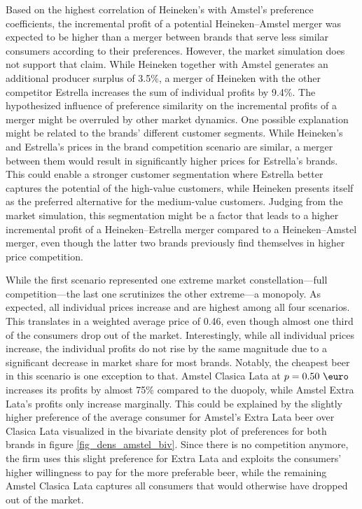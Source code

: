 \documentclass[12pt,a4paper]{article}
\begin{document}
Based on the highest correlation of Heineken's with Amstel's preference coefficients, the incremental profit of a potential Heineken--Amstel merger was expected to be higher than a merger between brands that serve less similar consumers according to their preferences.
However, the market simulation does not support that claim.
While Heineken together with Amstel generates an additional producer surplus of 3.5\%, a merger of Heineken with the other competitor Estrella increases the sum of individual profits by 9.4\%.
The hypothesized influence of preference similarity on the incremental profits of a merger might be overruled by other market dynamics.
One possible explanation might be related to the brands' different customer segments.
While Heineken's and Estrella's prices in the brand competition scenario are similar, a merger between them would result in significantly higher prices for Estrella's brands.
This could enable a stronger customer segmentation where Estrella better captures the potential of the high-value customers, while Heineken presents itself as the preferred alternative for the medium-value customers.
Judging from the market simulation, this segmentation might be a factor that leads to a higher incremental profit of a Heineken--Estrella merger compared to a Heineken--Amstel merger, even though the latter two brands previously find themselves in higher price competition.

While the first scenario represented one extreme market constellation---full competition---the last one scrutinizes the other extreme---a monopoly.
As expected, all individual prices increase and are highest among all four scenarios.
This translates in a weighted average price of 0.46\text{ \euro }, even though almost one third of the consumers drop out of the market.
Interestingly, while all individual prices increase, the individual profits do not rise by the same magnitude due to a significant decrease in market share for most brands.
Notably, the cheapest beer in this scenario is one exception to that.
Amstel Clasica Lata at $p=0.50\text{ \euro}$ increases its profits by almost 75\% compared to the duopoly, while Amstel Extra Lata's profits only increase marginally.
This could be explained by the slightly higher preference of the average consumer for Amstel's Extra Lata beer over Clasica Lata visualized in the bivariate density plot of preferences for both brands in figure \ref{fig_dens_amstel_biv}.
Since there is no competition anymore, the firm uses this slight preference for Extra Lata and exploits the consumers' higher willingness to pay for the more preferable beer, while the remaining Amstel Clasica Lata captures all consumers that would otherwise have dropped out of the market.
\end{document}
